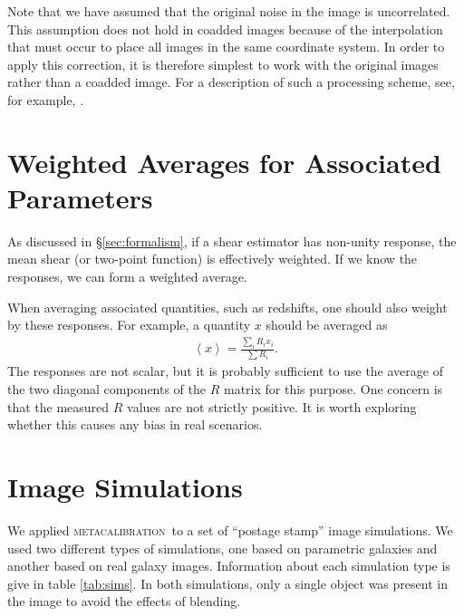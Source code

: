 \documentclass[iop, twocolappendix, appendixfloats, numberedappendix, apj]{emulateapj}
\newcommand{\mcal}{\textsc{metacalibration}}
\begin{document}
Note that we have assumed that the original noise in the image is uncorrelated.
This assumption does not hold in coadded images because of the interpolation
that must occur to place all images in the same coordinate system.  In order to
apply this correction, it is therefore simplest to work with the original
images rather than a coadded image.  For a description of such a processing
scheme, see, for example, \cite{Jarvis2016}.


\section{Weighted Averages for Associated Parameters} \label{sec:weighting}

As discussed in \S \ref{sec:formalism}, if a shear estimator has
non-unity response, the mean shear (or two-point function) is effectively
weighted.  If we know the responses, we can form a weighted average.

When averaging associated quantities, such as redshifts, one should also weight
by these responses.  For example, a quantity $x$ should be averaged as
\begin{align}
    \left< x \right> = \frac{\sum_i R_i x_i}{\sum R_i}.
\end{align}
The responses are not scalar, but it is probably sufficient
to use the average of the two diagonal components of the $R$ matrix
for this purpose. One concern is that the measured $R$ values are not
strictly positive.  It is worth exploring whether this causes
any bias in real scenarios.

\section{Image Simulations} \label{sec:sims}

We applied \mcal\ to a set of ``postage stamp'' image simulations.  We used two
different types of simulations, one based on parametric galaxies and another
based on real galaxy images.  Information about each simulation type is give in
table \ref{tab:sims}.  In both simulations, only a single object was present
in the image to avoid the effects of blending.
\end{document}
